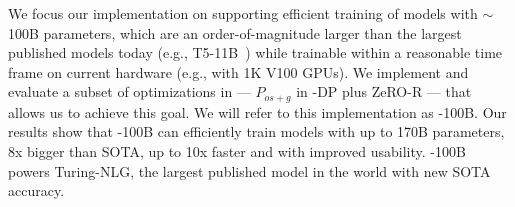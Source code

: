 We focus our implementation on supporting efficient training of models with {$\sim$}100B parameters, which are an order-of-magnitude larger than the largest published models today (e.g., T5-11B~\cite{T5}) while trainable within a reasonable time frame on current hardware (e.g., with 1K V100 GPUs).  We implement and evaluate a subset of optimizations in \name --- $P_{os+g}$ in \name-DP plus ZeRO-R --- that allows us to achieve this goal. We will refer to this implementation as \name-100B.  Our results show that \name-100B can efficiently train models with up to 170B parameters, 8x bigger than SOTA, up to 10x faster and with improved usability. \name-100B powers Turing-NLG, the largest published model in the world with new SOTA accuracy.   


